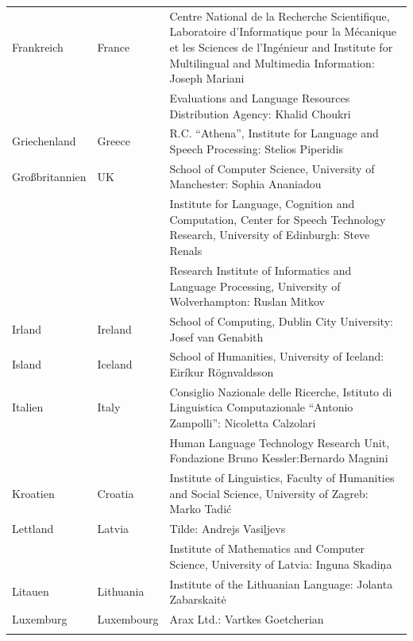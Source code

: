 \documentclass[]{../../metanetpaper}
\begin{document}
\begin{longtable}{@{}llp{113mm}@{}}
  Frankreich & \textcolor{grey1}{France} & Centre National de la Recherche Scientifique, Laboratoire d'Informatique pour la Mécanique et les Sciences de l'Ingénieur and Institute for Multilingual and Multimedia Information: Joseph Mariani \\ \addlinespace
  & & Evaluations and Language Resources Distribution Agency: Khalid Choukri\\ \addlinespace 
  Griechenland & \textcolor{grey1}{Greece} & R.C. “Athena”, Institute for Language and Speech Processing: Stelios Piperidis\\ \addlinespace
  Großbritannien & \textcolor{grey1}{UK} & 
  School of Computer Science, University of Manchester: Sophia Ananiadou \\ \addlinespace 
  & & Institute for Language, Cognition and Computation, Center for Speech Technology Research, University of Edinburgh: Steve Renals \\ \addlinespace 
  & & Research Institute of Informatics and Language Processing, University of Wolverhampton: Ruslan Mitkov \\ \addlinespace 
  Irland & \textcolor{grey1}{Ireland} & School of Computing, Dublin City University: Josef van Genabith\\ \addlinespace
  Island & \textcolor{grey1}{Iceland} & School of Humanities, University of Iceland: Eiríkur Rögnvaldsson\\ \addlinespace
  Italien & \textcolor{grey1}{Italy} & Consiglio Nazionale delle Ricerche, Istituto di Linguistica Computazionale “Antonio Zampolli”: Nicoletta Calzolari\\ \addlinespace
  & & Human Language Technology Research Unit, Fondazione Bruno Kessler:\newline Bernardo Magnini\\ \addlinespace 
  Kroatien & \textcolor{grey1}{Croatia} & Institute of Linguistics, Faculty of Humanities and Social Science, University of Zagreb: Marko Tadić \\ \addlinespace
  Lettland & \textcolor{grey1}{Latvia} & Tilde: Andrejs Vasiļjevs\\ \addlinespace 
  & & Institute of Mathematics and Computer Science, University of Latvia: Inguna Skadiņa\\ \addlinespace
  Litauen & \textcolor{grey1}{Lithuania} & Institute of the Lithuanian Language: Jolanta Zabarskaitė\\ \addlinespace
  Luxemburg & \textcolor{grey1}{Luxembourg} & Arax Ltd.: Vartkes Goetcherian\\ \addlinespace

\end{longtable}
\end{document}
